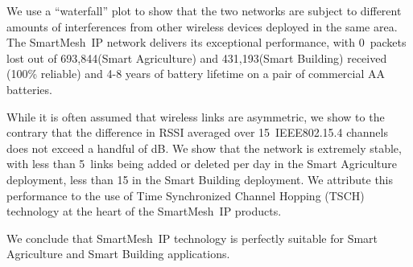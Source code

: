 \documentclass{elsarticle}
\newcommand{\smip}                {SmartMesh~IP\xspace}
\newcommand{\building}            {Smart Building\xspace}
\newcommand{\agri}                {Smart Agriculture\xspace}
\newcommand{\PEACHNUMPCKTS}       {693,844\xspace}
\newcommand{\EVANUMPCKTS}         {431,193\xspace}
\begin{document}

We use a ``waterfall'' plot to show that the two networks are subject to different amounts of interferences from other wireless devices deployed in the same area.
The \smip network delivers its exceptional performance, with 0~packets lost out of \PEACHNUMPCKTS (\agri) and \EVANUMPCKTS (\building) received (100\% reliable) and 4-8 years of battery lifetime on a pair of commercial AA batteries.


While it is often assumed that wireless links are asymmetric, we show to the contrary that the difference in RSSI averaged over 15~IEEE802.15.4 channels does not exceed a handful of dB.
We show that the network is extremely stable, with less than 5~links being added or deleted per day in the \agri deployment, less than 15 in the \building deployment.
We attribute this performance to the use of Time Synchronized Channel Hopping (TSCH) technology at the heart of the \smip products.


We conclude that \smip technology is perfectly suitable for \agri and \building applications.

\newpage
%
%
\end{document}
